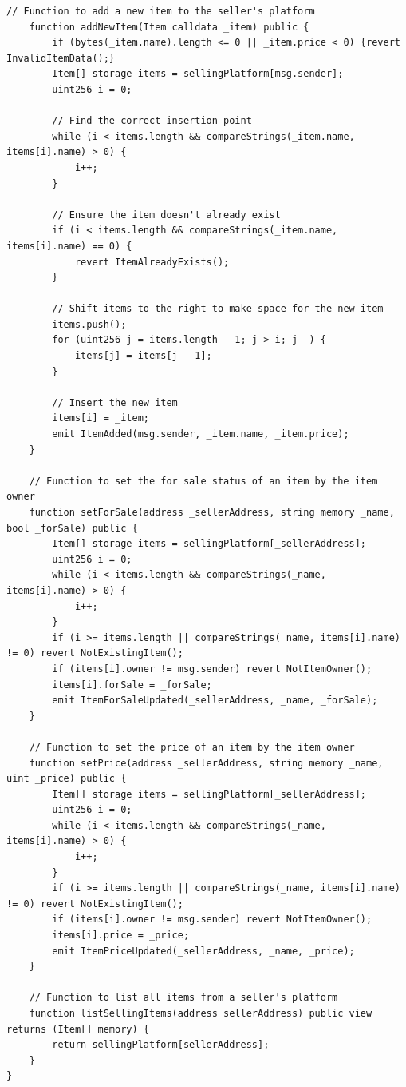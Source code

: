 \documentclass[runningheads]{llncs}
\begin{document}
\begin{lstlisting}[numbers=none]
    // Function to add a new item to the seller's platform
    function addNewItem(Item calldata _item) public {
        if (bytes(_item.name).length <= 0 || _item.price < 0) {revert InvalidItemData();}
        Item[] storage items = sellingPlatform[msg.sender];
        uint256 i = 0;

        // Find the correct insertion point
        while (i < items.length && compareStrings(_item.name, items[i].name) > 0) {
            i++;
        }

        // Ensure the item doesn't already exist
        if (i < items.length && compareStrings(_item.name, items[i].name) == 0) {
            revert ItemAlreadyExists();
        }

        // Shift items to the right to make space for the new item
        items.push();
        for (uint256 j = items.length - 1; j > i; j--) {
            items[j] = items[j - 1];
        }

        // Insert the new item
        items[i] = _item;
        emit ItemAdded(msg.sender, _item.name, _item.price);
    }

    // Function to set the for sale status of an item by the item owner
    function setForSale(address _sellerAddress, string memory _name, bool _forSale) public {
        Item[] storage items = sellingPlatform[_sellerAddress];
        uint256 i = 0;
        while (i < items.length && compareStrings(_name, items[i].name) > 0) {
            i++;
        }
        if (i >= items.length || compareStrings(_name, items[i].name) != 0) revert NotExistingItem();
        if (items[i].owner != msg.sender) revert NotItemOwner();
        items[i].forSale = _forSale;
        emit ItemForSaleUpdated(_sellerAddress, _name, _forSale);
    }

    // Function to set the price of an item by the item owner
    function setPrice(address _sellerAddress, string memory _name, uint _price) public {
        Item[] storage items = sellingPlatform[_sellerAddress];
        uint256 i = 0;
        while (i < items.length && compareStrings(_name, items[i].name) > 0) {
            i++;
        }
        if (i >= items.length || compareStrings(_name, items[i].name) != 0) revert NotExistingItem();
        if (items[i].owner != msg.sender) revert NotItemOwner();
        items[i].price = _price;
        emit ItemPriceUpdated(_sellerAddress, _name, _price);
    }

    // Function to list all items from a seller's platform
    function listSellingItems(address sellerAddress) public view returns (Item[] memory) {
        return sellingPlatform[sellerAddress];
    }
}

\end{lstlisting}
\end{document}

